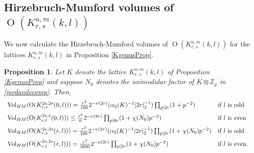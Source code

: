 \documentclass[12pt, a4paper]{article}
\newtheorem{proposition}[thm]{Proposition}
\newcommand{\ZZ}{\mathbb{Z}}
\newcommand{\opn}{\operatorname}
\begin{document}
\subsection{Hirzebruch-Mumford volumes of $\opn{O}(K^{u,m}_{r,s}(k,l))$}
We now calculate the Hirzebruch-Mumford volumes of $\opn{O}(K^{u,m}_{r,s}(k,l))$ for the lattices $K^{u,m}_{r,s}(k,l)$ in Proposition \ref{KgenusProp}. 
\begin{proposition}\label{KHMvolProp}
  Let $K$ denote the lattice $K^{u,m}_{r,s}(k,l)$ of Proposition \ref{KgenusProp} and suppose $N_0$ denotes the unimodular factor of $K \otimes \ZZ_p$ in \eqref{jordandecomp}.
  Then, 
\[
  \begin{array}{l l}
\opn{Vol}_{HM}(\opn{O}(K^{2s, 2s}_{r,s}(0,l)))  = \frac{r^2}{160} 2^{-\nu(2r)} (\alpha_2(K)^{-1} \vert 2r \vert_2^{-1}) \prod_{p \vert 2r} (1 + p^{-2})
    & \text{if $l$ is odd} \\[7pt]
    \opn{Vol}_{HM}(\opn{O}(K^{2s, s}_{r,l}(0,l)))  \leq \frac{r^2}{6}2^{-\nu(8r)} \prod_{p \vert 8r} (1 + \chi(N_0)p^{-2}) & \text{if $l$ is even} \\[7pt]
    \opn{Vol}_{HM}(\opn{O}(K^{2s,2s}_{r,s}(r,l)))  = 
    \frac{r^2}{160} 2^{-\nu(2r)} (\alpha_2(K)^{-1} \vert 2r \vert_2^{-1}) \prod_{p \vert 2r}(1 + \chi(N_0)p^{-2})
    & \text{if $l$ is odd} \\[7pt]
    \opn{Vol}_{HM}(\opn{O}(K^{2s, 2s}_{r,l}(r,l)))  = \frac{r^2}{3600}2^{-\nu(2r)} \prod_{p \vert 2r} (1 + \chi(N_0)p^{-2}) & \text{if $l$ is even.}
  \end{array}
  \]
\end{proposition}
\end{document}
